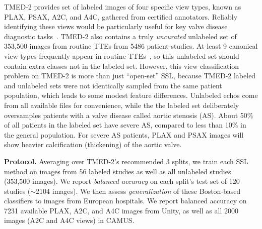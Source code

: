 

TMED-2 provides set of labeled images of four specific view types, known as PLAX, PSAX, A2C, and A4C, gathered from certified annotators.
Reliably identifying these views would be particularly useful for key valve disease diagnostic tasks~\citep{huangNewSemisupervisedLearning2021, wessler2023automated}.
TMED-2 also contains a truly \emph{uncurated} unlabeled set of 353,500 images from routine TTEs from 5486 patient-studies.
At least 9 canonical view types frequently appear in routine TTEs~\citep{mitchellGuidelinesPerformingComprehensive2019}, so this unlabeled set should contain extra classes not in the labeled set. However, this view classification problem on TMED-2 is more than just ``open-set'' SSL, because TMED-2 labeled and unlabeled sets were not identically sampled from the same patient population, which leads to some modest feature differences. Unlabeled echos come from all available files for convenience, while the the labeled set deliberately oversamples patients with a valve disease called aortic stenosis (AS).
About 50\% of all patients in the labeled set have severe AS, compared to less than 10\% in the general population.
For severe AS patients, PLAX and PSAX images will show heavier calcification (thickening) of the aortic valve.

\textbf{Protocol.} 
Averaging over TMED-2's recommended 3 splits, 
we train each SSL method on images from 56 labeled studies as well as all unlabeled studies (353,500 images). 
We report \emph{balanced accuracy} on each split's test set of 120 studies ($\sim$2104 images).
We then assess \emph{generalization} of these Boston-based classifiers to images from European hospitals.
We report balanced accuracy on 7231 available PLAX, A2C, and A4C images from Unity,
as well as all 2000 images (A2C and A4C views) in CAMUS.

